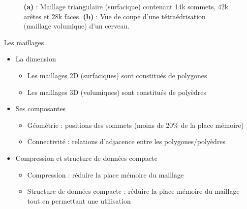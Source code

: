 \documentclass[9pt]{beamer}
\begin{document}
\begin{frame}
\begin{figure}[H]
\begin{subfigure}{.5\textwidth}
  \caption{}
\end{subfigure}
\caption{\textbf{(a)} : Maillage triangulaire (surfacique) contenant 14k sommets, 42k arêtes et 28k faces. \textbf{(b)} : Vue de coupe d'une tétraédrisation (maillage volumique) d'un cerveau.}
\end{figure}
\small
\begin{block}{Les maillages}
\begin{itemize}
\item La dimension
\begin{itemize}
\item Les maillages 2D (surfaciques) sont constitués de polygones
\item Les maillages 3D (volumiques) sont constitués de polyèdres
\end{itemize}
\item Ses composantes
\begin{itemize}
\item Géométrie : positions des sommets (moins de 20\% de la place mémoire)
\item Connectivité : relations d’adjacence entre les polygones/polyèdres
\end{itemize}
\item Compression et structure de données compacte
\begin{itemize}
\item Compression : réduire la place mémoire du maillage
\item Structure de données compacte : réduire la place mémoire du maillage tout en permettant une utilisation
\end{itemize}
\end{itemize}
\end{block}
\end{frame}
\end{document}
